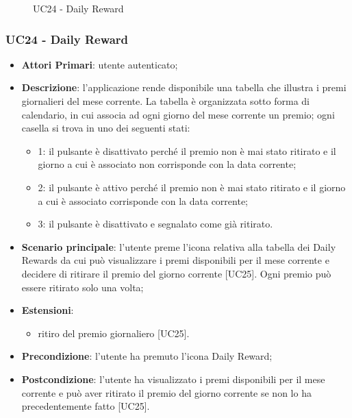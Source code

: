 
\begin{figure}[h]
	\centering
	\caption{UC24 - Daily Reward}
\end{figure}
\subsubsection{UC24 - Daily Reward}
\begin{itemize}
	\item \textbf{Attori Primari}: utente autenticato;
	\item \textbf{Descrizione}: l'applicazione rende disponibile una tabella che illustra i premi giornalieri del mese corrente. La tabella è organizzata sotto forma di calendario, in cui associa ad ogni giorno del mese corrente un premio;
	ogni casella si trova in uno dei seguenti stati:
	\begin{itemize}
		\item 1: il pulsante è disattivato perché il premio non è mai stato ritirato e il giorno a cui è associato non corrisponde con la data corrente;
		\item 2: il pulsante è attivo perché il premio non è mai stato ritirato e il giorno a cui è associato corrisponde con la data corrente;
		\item 3: il pulsante è disattivato e segnalato come già ritirato. 
	\end{itemize} 
	\item \textbf{Scenario principale}: l'utente preme l'icona relativa alla tabella dei Daily Rewards da cui può visualizzare i premi disponibili per il mese corrente e decidere di ritirare il premio del giorno corrente [UC25].
	Ogni premio può essere ritirato solo una volta;
	\item \textbf{Estensioni}: 
		\begin{itemize}
			\item ritiro del premio giornaliero [UC25].
		\end{itemize}
	\item \textbf{Precondizione}: l'utente ha premuto l'icona Daily Reward;
	\item \textbf{Postcondizione}: l'utente ha visualizzato i premi disponibili per il mese corrente e può aver ritirato il premio del giorno corrente se non lo ha precedentemente fatto [UC25]. 
\end{itemize} 

